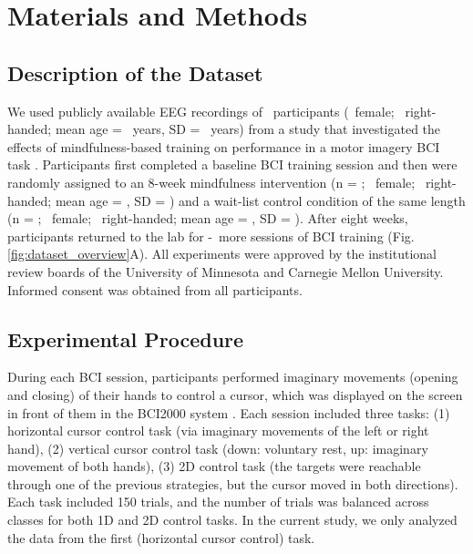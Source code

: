 \section{Materials and Methods}
    
\subsection{Description of the Dataset}

We used publicly available EEG recordings of \numSubjects~participants (\numFemaleSubjects~female; \numRightHandedSubjects~right-handed; mean age = \meanAge~years, SD = \sdAge~years) from a study that investigated the effects of mindfulness-based training on performance in a motor imagery BCI task \citep{Stieger2021_dataset}. Participants first completed a baseline BCI training session and then were randomly assigned to an 8-week mindfulness intervention (n = \numMBSRSubjects; \numFemaleMBSRSubjects~female; \numRightHandedMBSRSubjects~right-handed; mean age = \meanAgeMBSR, SD = \sdAgeMBSR) and a wait-list control condition of the same length (n = \numControlSubjects; \numFemaleControlSubjects~female; \numRightHandedControlSubjects~right-handed; mean age = \meanAgeControl, SD = \sdAgeControl). After eight weeks, participants returned to the lab for \numFollowUpSessionsMin-\numFollowUpSessionsMax~more sessions of BCI training (Fig. \ref{fig:dataset_overview}A). All experiments were approved by the institutional review boards of the University of Minnesota and Carnegie Mellon University. Informed consent was obtained from all participants.

\subsection{Experimental Procedure}

During each BCI session, participants performed imaginary movements (opening and closing) of their hands to control a cursor, which was displayed on the screen in front of them in the BCI2000 system \citep{BCI2000_Schalk2004}. Each session included three tasks: (1) horizontal cursor control task (via imaginary movements of the left or right hand), (2) vertical cursor control task (down: voluntary rest, up: imaginary movement of both hands), (3) 2D control task (the targets were reachable through one of the previous strategies, but the cursor moved in both directions). Each task included 150 trials, and the number of trials was balanced across classes for both 1D and 2D control tasks. In the current study, we only analyzed the data from the first (horizontal cursor control) task.

